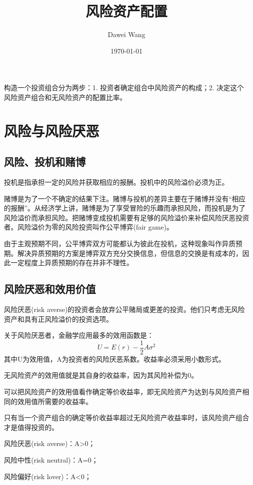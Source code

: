 \documentclass{article}
\title{风险资产配置}
\author{Dawei Wang}
\date{\today}
\begin{document}
	\maketitle
构造一个投资组合分为两步：1. 投资者确定组合中风险资产的构成；2. 决定这个风险资产组合和无风险资产的配置比率。 
\section{风险与风险厌恶}
\subsection{风险、投机和赌博}
投机是指承担一定的风险并获取相应的报酬。投机中的风险溢价必须为正。

赌博是为了一个不确定的结果下注。赌博与投机的差异主要在于赌博并没有“相应的报酬”。从经济学上讲，赌博是为了享受冒险的乐趣而承担风险，而投机是为了风险溢价而承担风险。把赌博变成投机需要有足够的风险溢价来补偿风险厌恶投资者。风险溢价为零的风险投资叫作公平博弈(fair game)。

由于主观预期不同，公平博弈双方可能都认为彼此在投机，这种现象叫作异质预期。解决异质预期的方案是博弈双方充分交换信息，但信息的交换是有成本的，因此一定程度上异质预期的存在并非不理性。

\subsection{风险厌恶和效用价值}
风险厌恶(risk averse)的投资者会放弃公平赌局或更差的投资。他们只考虑无风险资产和具有正风险溢价的投资选项。

关于风险厌恶者，金融学应用最多的效用函数是：
\[
U=E(r)-\frac{1}{2}A\sigma^2
\]
其中U为效用值，A为投资者的风险厌恶系数。收益率必须采用小数形式。

\hspace*{\fill}

无风险资产的效用值就是其自身的收益率，因为其风险补偿为0。

可以把风险资产的效用值看作确定等价收益率，即无风险资产为达到与风险资产相同的效用值所需要的收益率。

只有当一个资产组合的确定等价收益率超过无风险资产收益率时，该风险资产组合才是值得投资的。

\hspace*{\fill}

风险厌恶(risk averse)：A>0；

风险中性(risk neutral)：A=0；

风险偏好(risk lover)：A<0；

\hspace*{\fill}
\end{document}
